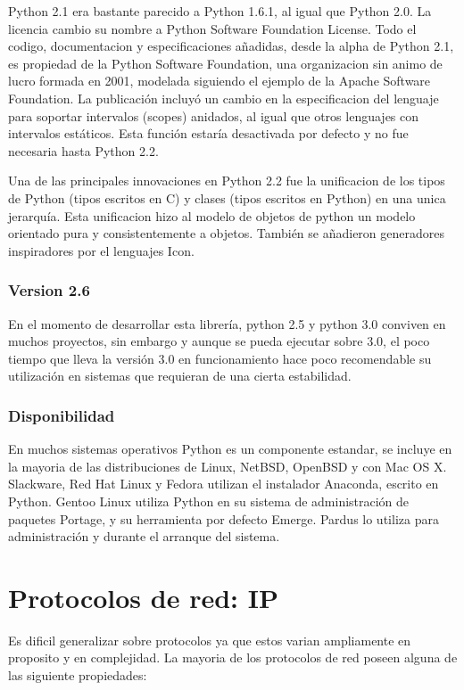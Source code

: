 \documentclass[a4paper,spanish,12pt]{book}
\begin{document}
Python 2.1 era bastante parecido a Python 1.6.1, al igual que Python 2.0. La licencia cambio su nombre a Python Software Foundation License. Todo el codigo, documentacion y especificaciones añadidas, desde la alpha de Python 2.1, es propiedad de la Python Software Foundation, una organizacion sin animo de lucro formada en 2001, modelada siguiendo el ejemplo de la Apache Software Foundation. La publicación incluyó un cambio en la especificacion del lenguaje para soportar intervalos (scopes) anidados, al igual que otros lenguajes con intervalos estáticos. Esta función estaría desactivada por defecto y no fue necesaria hasta Python 2.2.

Una de las principales innovaciones en Python 2.2 fue la unificacion de los tipos de Python (tipos escritos en C) y clases (tipos escritos en Python) en una unica jerarquía. Esta unificacion hizo al modelo de objetos de python un modelo orientado pura y consistentemente a objetos. Tambi\'en se añadieron generadores inspiradores por el lenguajes Icon.

\subsubsection{Version 2.6}

En el momento de desarrollar esta librería, python 2.5 y python 3.0 conviven en muchos proyectos, sin embargo y aunque se pueda ejecutar sobre 3.0, el poco tiempo que lleva la versión 3.0 en funcionamiento hace poco recomendable su utilización en sistemas que requieran de una cierta estabilidad.

\subsubsection{Disponibilidad}

En muchos sistemas operativos Python es un componente estandar, se incluye en la mayoria de las distribuciones de Linux, NetBSD, OpenBSD y con Mac OS X. Slackware, Red Hat Linux y Fedora utilizan el instalador Anaconda, escrito en Python. Gentoo Linux utiliza Python en su sistema de administración de paquetes Portage, y su herramienta por defecto Emerge. Pardus lo utiliza para administración y durante el arranque del sistema.

\section{Protocolos de red: IP}
Es dificil generalizar sobre protocolos ya que estos varian ampliamente en proposito y en complejidad. La mayoria de los protocolos de red poseen alguna de las siguiente propiedades:
\end{document}

